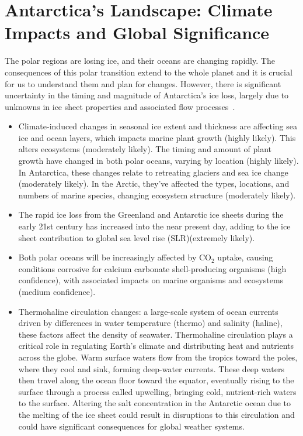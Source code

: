 \chapter*{Antarctica's Landscape: Climate Impacts and Global Significance}\label{why}

The polar regions are losing ice, and their oceans are changing rapidly\cite{O_C_in_changingClimate}. The consequences of this polar transition extend to the whole planet and it is crucial for us to understand them and plan for changes. However, there is significant uncertainty in the timing and magnitude of Antarctica's ice loss, largely due to unknowns in ice sheet properties and associated flow processes~\cite{IPCC}.
\begin{itemize}
\item Climate-induced changes in seasonal ice extent and thickness are affecting sea ice and ocean layers, which impacts marine plant growth (highly likely). This alters ecosystems (moderately likely). The timing and amount of plant growth have changed in both polar oceans, varying by location (highly likely). In Antarctica, these changes relate to retreating glaciers and sea ice change (moderately likely). In the Arctic, they've affected the types, locations, and numbers of marine species, changing ecosystem structure (moderately likely)\cite{O_C_in_changingClimate}.
\item The rapid ice loss from the Greenland and Antarctic ice sheets during the early 21st century has increased into the near present day, adding to the ice sheet contribution to global sea level rise (SLR)(extremely likely)\cite{O_C_in_changingClimate}.
\item Both polar oceans will be increasingly affected by $\mathrm{CO_2}$ uptake, causing conditions corrosive for calcium carbonate shell-producing organisms (high confidence), with associated impacts on marine organisms and ecosystems (medium confidence)\cite{O_C_in_changingClimate}.
\item Thermohaline circulation changes: a large-scale system of ocean currents driven by differences in water temperature (thermo) and salinity (haline), these factors affect the density of seawater. Thermohaline circulation plays a critical role in regulating Earth's climate and distributing heat and nutrients across the globe. Warm surface waters flow from the tropics toward the poles, where they cool and sink, forming deep-water currents. These deep waters then travel along the ocean floor toward the equator, eventually rising to the surface through a process called upwelling, bringing cold, nutrient-rich waters to the surface\cite{JACOBS_2004}. Altering the salt concentration in the Antarctic ocean due to the melting of the ice sheet could result in disruptions to this circulation and could have significant consequences for global weather systems.
\end{itemize}

